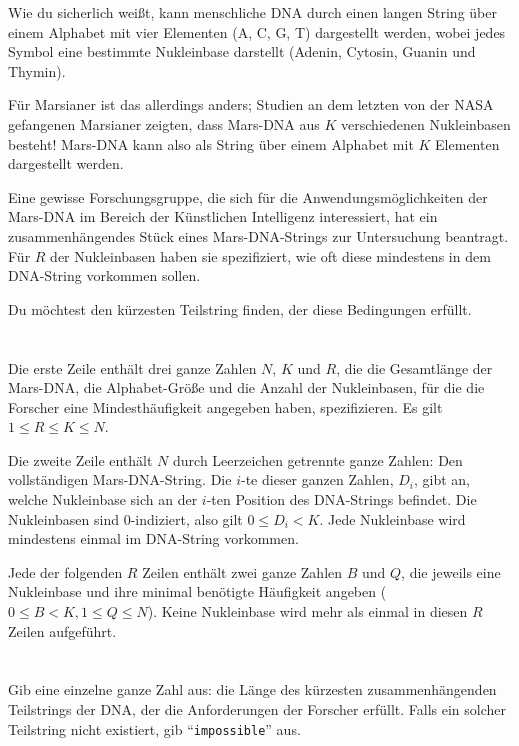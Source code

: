 \ifx\boi\undefined\fi
\def\version{jury-1}
Wie du sicherlich weißt, kann menschliche DNA durch einen langen String über einem Alphabet mit vier Elementen (A, C, G, T) dargestellt werden, wobei jedes Symbol eine bestimmte Nukleinbase darstellt (Adenin, Cytosin, Guanin und Thymin).

Für Marsianer ist das allerdings anders; Studien an dem letzten von der NASA gefangenen Marsianer zeigten, dass Mars-DNA aus $K$ verschiedenen Nukleinbasen besteht! Mars-DNA kann also als String über einem Alphabet mit $K$ Elementen dargestellt werden.

Eine gewisse Forschungsgruppe, die sich für die Anwendungsmöglichkeiten der Mars-DNA im Bereich der Künstlichen Intelligenz interessiert, hat ein zusammenhängendes Stück eines Mars-DNA-Strings zur Untersuchung beantragt. Für $R$ der Nukleinbasen haben sie spezifiziert, wie oft diese mindestens in dem DNA-String vorkommen sollen.

Du möchtest den kürzesten Teilstring finden, der diese Bedingungen erfüllt.

\section*{}
Die erste Zeile enthält drei ganze Zahlen $N$, $K$ und $R$, die die Gesamtlänge der Mars-DNA, die Alphabet-Größe und die Anzahl der Nukleinbasen, für die die Forscher eine Mindesthäufigkeit angegeben haben, spezifizieren. Es gilt $1 \le R \le K \le N$.

Die zweite Zeile enthält $N$ durch Leerzeichen getrennte ganze Zahlen: Den vollständigen Mars-DNA-String.
Die $i$-te dieser ganzen Zahlen, $D_i$, gibt an, welche Nukleinbase sich an der $i$-ten Position des DNA-Strings befindet.
Die Nukleinbasen sind $0$-indiziert, also gilt $0 \leq D_i < K$. Jede Nukleinbase wird mindestens einmal im DNA-String vorkommen.

Jede der folgenden $R$ Zeilen enthält zwei ganze Zahlen $B$ und $Q$, die jeweils eine Nukleinbase und ihre minimal benötigte Häufigkeit angeben ($0 \le B < K, 1 \le Q \le N$).
Keine Nukleinbase wird mehr als einmal in diesen $R$ Zeilen aufgeführt.

\section*{\outputsection}
Gib eine einzelne ganze Zahl aus: die Länge des kürzesten zusammenhängenden Teilstrings der DNA, der die Anforderungen der Forscher erfüllt.
Falls ein solcher Teilstring nicht existiert, gib ``\texttt{impossible}'' aus.

